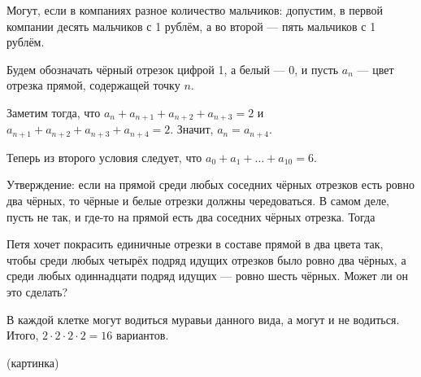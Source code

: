 \begin{itemize}
\itA Могут, если в компаниях разное количество мальчиков: допустим, в первой компании десять мальчиков с 1 рублём, а во второй --- пять мальчиков с 1 рублём.

\itB 

Будем обозначать чёрный отрезок цифрой 1, а белый --- 0, и пусть $a_n$ --- цвет отрезка прямой, содержащей
точку $n$.

Заметим тогда, что $a_n+a_{n+1}+a_{n+2}+a_{n+3} = 2$ и $a_{n+1}+a_{n+2}+a_{n+3}+a_{n+4} = 2$. 
Значит, $a_n = a_{n+4}$. 

Теперь из второго условия следует, что $a_0+a_1+ \dots +a_{10} = 6$. 



Утверждение: если на прямой среди любых соседних чёрных отрезков есть ровно два чёрных, то чёрные и белые отрезки
должны чередоваться. В самом деле, пусть не так, и где-то на прямой есть два соседних чёрных отрезка. 
Тогда 


Петя хочет покрасить единичные отрезки в составе прямой в два цвета так, чтобы среди любых четырёх подряд идущих отрезков было ровно два чёрных, а среди любых одиннадцати подряд идущих — ровно шесть чёрных. Может ли он это сделать?

\itC В каждой клетке могут водиться муравьи данного вида, а могут и не водиться. Итого, $2 \cdot 2 \cdot 2 \cdot 2 = 16$ вариантов. 

(картинка)
\end{itemize}
